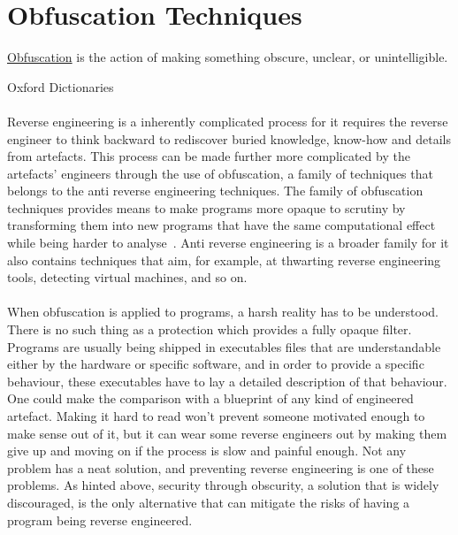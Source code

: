 \newpage
\section{Obfuscation Techniques} \label{sec:anti_reverse_engineering}
\begin{framed}
	\begin{definition} 
		\underline{Obfuscation} is the action of making something obscure, unclear, or unintelligible.
		\begin{flushright}
			\hfill{}{Oxford Dictionaries~\cite{od:obfuscation}}
		\end{flushright}
	\end{definition}
\end{framed}

\paragraph{}
Reverse engineering is a inherently complicated process for it requires the reverse engineer to think backward to rediscover buried knowledge, know-how and details from artefacts. This process can be made further more complicated by the artefacts' engineers through the use of obfuscation, a family of techniques that belongs to the anti reverse engineering techniques. The family of obfuscation techniques provides means to make programs more opaque to scrutiny by transforming them into new programs that have the same computational effect while being harder to analyse~\cite{Dang:2014:PRE:2636663}. Anti reverse engineering is a broader family for it also contains techniques that aim, for example, at thwarting reverse engineering tools, detecting virtual machines, and so on.

\paragraph{}
When obfuscation is applied to programs, a harsh reality has to be understood. There is no such thing as a protection which provides a fully opaque filter. Programs are usually being shipped in executables files that are understandable either by the hardware or specific software, and in order to provide a specific behaviour, these executables have to lay a detailed description of that behaviour. One could make the comparison with a blueprint of any kind of engineered artefact. Making it hard to read won't prevent someone motivated enough to make sense out of it, but it can wear some reverse engineers out by making them give up and moving on if the process is slow and painful enough. Not any problem has a neat solution, and preventing reverse engineering is one of these problems. As hinted above, security through obscurity, a solution that is widely discouraged, is the only alternative that can mitigate the risks of having a program being reverse engineered.

